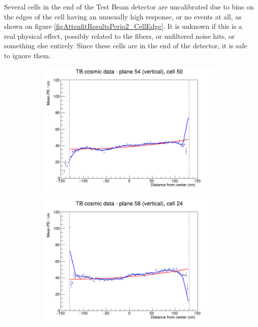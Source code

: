 \documentclass[12pt,a4paper]{article}
\begin{document}
Several cells in the end of the Test Beam detector are uncalibrated due to bins on the edges of the cell having an unusually high response, or no events at all, as shown on figure \ref{figAttenfitResultsPerio2_CellEdge}. It is unknown if this is a real physical effect, possibly related to the fibers, or unfiltered noise hits, or something else entirely. Since these cells are in the end of the detector, it is safe to ignore them.

\begin{figure}[h]
  \begin{subfigure}{0.5\textwidth}
    \includegraphics[width=\linewidth]{RelativeCalibrationResults/p2_054_050.png}
  \end{subfigure}
  \begin{subfigure}{0.5\textwidth}
    \includegraphics[width=\linewidth]{RelativeCalibrationResults/p2_058_024.png}

\end{subfigure}
\end{figure}
\end{document}
